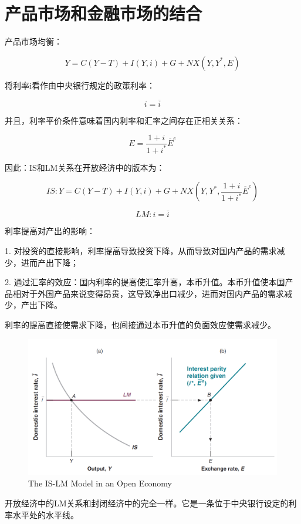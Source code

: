 \documentclass{article}
\begin{document}
\section{产品市场和金融市场的结合}

产品市场均衡：

\[
Y=C(Y-T)+I(Y,i)+G+NX(Y,Y^*,E)
\]

将利率i看作由中央银行规定的政策利率：

\[
i=\overline{i}
\]

并且，利率平价条件意味着国内利率和汇率之间存在正相关关系：

\[
E=\frac{1+i}{1+i^*}\overline{E}^e
\]

因此：IS和LM关系在开放经济中的版本为：

\[
IS:Y=C(Y-T)+I(Y,i)+G+NX(Y,Y^*,\frac{1+i}{1+i^*}\overline{E}^e)
\]

\[
LM:i=\overline{i}
\]

利率提高对产出的影响：

1. 对投资的直接影响，利率提高导致投资下降，从而导致对国内产品的需求减少，进而产出下降；

2. 通过汇率的效应：国内利率的提高使汇率升高，本币升值。本币升值使本国产品相对于外国产品来说变得昂贵，这导致净出口减少，进而对国内产品的需求减少，产出下降。

利率的提高直接使需求下降，也间接通过本币升值的负面效应使需求减少。

\begin{figure}[H] %
	\centering %
	\includegraphics[width=1\textwidth]{19_2} %
	\caption{The IS-LM Model in
		an Open Economy} %
	\label{Fig.main3} %
\end{figure}

开放经济中的LM关系和封闭经济中的完全一样。它是一条位于中央银行设定的利率水平处的水平线。
\end{document}
